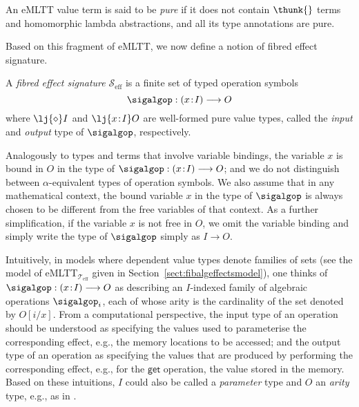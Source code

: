 \begin{definition}
An eMLTT value term is said to be \emph{pure} if it does not contain $\thunk{}$ terms and homomorphic lambda abstractions, and all its type annotations are pure.
\end{definition}

Based on this fragment of eMLTT, we now define a notion of fibred effect signature.

\begin{definition}
A \emph{fibred effect signature} $\mathcal{S}_{\text{eff}}$ is a finite set of typed operation symbols
\[
\sigalgop : (x \!:\! I) \longrightarrow O
\]
where $\lj {\diamond} I$ and $\lj {x \!:\! I} O$ are well-formed pure value types, called the \emph{input} and \emph{output} type of $\sigalgop$, respectively.
\end{definition}

Analogously to types and terms that involve variable bindings, the variable $x$ is bound in $O$ in the type of $\sigalgop : (x \!:\! I) \longrightarrow O$; and we do not distinguish between $\alpha$-equivalent types of operation symbols. We also assume that in any mathematical context, the bound variable $x$ in the type of $\sigalgop$ is always chosen to be different from the free variables of that context.
As a further simplification, if the variable $x$ is not free in $O$, we omit the variable binding and simply write the type of $\sigalgop$ simply as $I \longrightarrow O$.

Intuitively, in models where dependent value types denote families of sets (see the model of eMLTT$_{\mathcal{T}_{\text{eff}}}$ given in Section~\ref{sect:fibalgeffectsmodel}), one thinks of  $\sigalgop : (x \!:\! I) \longrightarrow O$ as describing an $I$-indexed family of algebraic operations $\sigalgop_i$, each of whose arity is the cardinality of the set denoted by $O[i/x]$. 
From a computational perspective, the input type of an operation should be understood as specifying the values used to parameterise the corresponding effect, e.g., the memory locations to be accessed; and the output type of an operation as specifying the values that are produced by performing the corresponding effect, e.g., for the $\mathsf{get}$ operation, the value stored in the memory. 
Based on these intuitions, $I$ could also be called a \emph{parameter} type and $O$ an \emph{arity} type, e.g., as in \cite{Plotkin:HandlingEffects}.

